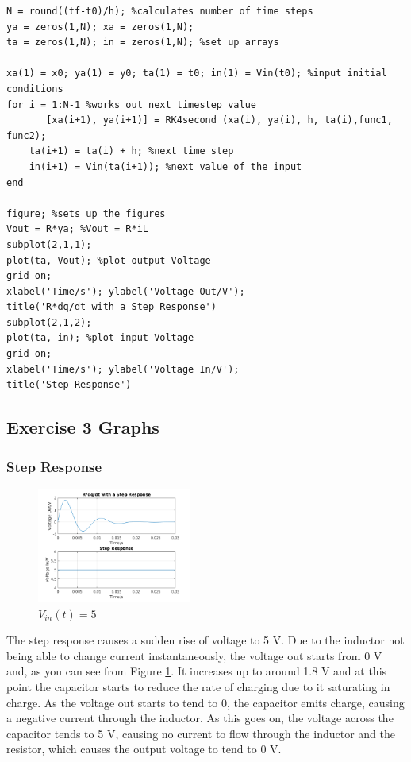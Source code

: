 \documentclass[11pt,a4paper]{article}
\begin{document}
\begin{verbatim}
N = round((tf-t0)/h); %calculates number of time steps
ya = zeros(1,N); xa = zeros(1,N);
ta = zeros(1,N); in = zeros(1,N); %set up arrays

xa(1) = x0; ya(1) = y0; ta(1) = t0; in(1) = Vin(t0); %input initial conditions
for i = 1:N-1 %works out next timestep value
	   [xa(i+1), ya(i+1)] = RK4second (xa(i), ya(i), h, ta(i),func1, func2);
    ta(i+1) = ta(i) + h; %next time step
    in(i+1) = Vin(ta(i+1)); %next value of the input
end

figure; %sets up the figures
Vout = R*ya; %Vout = R*iL
subplot(2,1,1);
plot(ta, Vout); %plot output Voltage
grid on;
xlabel('Time/s'); ylabel('Voltage Out/V');
title('R*dq/dt with a Step Response')
subplot(2,1,2);
plot(ta, in); %plot input Voltage
grid on;
xlabel('Time/s'); ylabel('Voltage In/V');
title('Step Response')
\end{verbatim}

\subsection{Exercise 3 Graphs}
\subsubsection{Step Response}

\begin{figure}

	\vspace{-10mm}
  		\includegraphics[width=0.45\textwidth]{Ex3_Figs/Step.png}
	\vspace{-3mm}
  	\caption{$V_{in}(t)= 5$}
  	\label{fig:ex3g1}

\end{figure}

    \vspace{0mm}The step response causes a sudden rise of voltage to 5 V. Due to the inductor not being able to change current instantaneously, the voltage out starts from 0 V and, as you can see from Figure \ref{fig:ex3g1}. It increases up to around 1.8 V and at this point the capacitor starts to reduce the rate of charging due to it saturating in charge. As the voltage out starts to tend to 0, the capacitor emits charge, causing a negative current through the inductor. As this goes on, the voltage across the capacitor tends to 5 V, causing no current to flow through the inductor and the resistor, which causes the output voltage to tend to 0 V.
\end{document}
